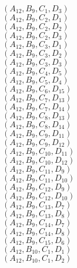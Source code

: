 \documentclass[14pt]{article}
\begin{document}
    $({A}_{12}, {B}_{9}, {C}_{1}, {D}_{3}) $ \\ 
    $({A}_{12}, {B}_{9}, {C}_{2}, {D}_{1}) $ \\ 
    $({A}_{12}, {B}_{9}, {C}_{2}, {D}_{2}) $ \\ 
    $({A}_{12}, {B}_{9}, {C}_{2}, {D}_{3}) $ \\ 
    $({A}_{12}, {B}_{9}, {C}_{3}, {D}_{1}) $ \\ 
    $({A}_{12}, {B}_{9}, {C}_{3}, {D}_{2}) $ \\ 
    $({A}_{12}, {B}_{9}, {C}_{3}, {D}_{3}) $ \\ 
    $({A}_{12}, {B}_{9}, {C}_{4}, {D}_{5}) $ \\ 
    $({A}_{12}, {B}_{9}, {C}_{5}, {D}_{4}) $ \\ 
    $({A}_{12}, {B}_{9}, {C}_{6}, {D}_{15}) $ \\ 
    $({A}_{12}, {B}_{9}, {C}_{7}, {D}_{13}) $ \\ 
    $({A}_{12}, {B}_{9}, {C}_{7}, {D}_{14}) $ \\ 
    $({A}_{12}, {B}_{9}, {C}_{8}, {D}_{13}) $ \\ 
    $({A}_{12}, {B}_{9}, {C}_{8}, {D}_{14}) $ \\ 
    $({A}_{12}, {B}_{9}, {C}_{9}, {D}_{11}) $ \\ 
    $({A}_{12}, {B}_{9}, {C}_{9}, {D}_{12}) $ \\ 
    $({A}_{12}, {B}_{9}, {C}_{10}, {D}_{11}) $ \\ 
    $({A}_{12}, {B}_{9}, {C}_{10}, {D}_{12}) $ \\ 
    $({A}_{12}, {B}_{9}, {C}_{11}, {D}_{9}) $ \\ 
    $({A}_{12}, {B}_{9}, {C}_{11}, {D}_{10}) $ \\ 
    $({A}_{12}, {B}_{9}, {C}_{12}, {D}_{9}) $ \\ 
    $({A}_{12}, {B}_{9}, {C}_{12}, {D}_{10}) $ \\ 
    $({A}_{12}, {B}_{9}, {C}_{13}, {D}_{7}) $ \\ 
    $({A}_{12}, {B}_{9}, {C}_{13}, {D}_{8}) $ \\ 
    $({A}_{12}, {B}_{9}, {C}_{14}, {D}_{7}) $ \\ 
    $({A}_{12}, {B}_{9}, {C}_{14}, {D}_{8}) $ \\ 
    $({A}_{12}, {B}_{9}, {C}_{15}, {D}_{6}) $ \\ 
    $({A}_{12}, {B}_{10}, {C}_{1}, {D}_{1}) $ \\ 
    $({A}_{12}, {B}_{10}, {C}_{1}, {D}_{2}) $ \\ 
\end{document}
